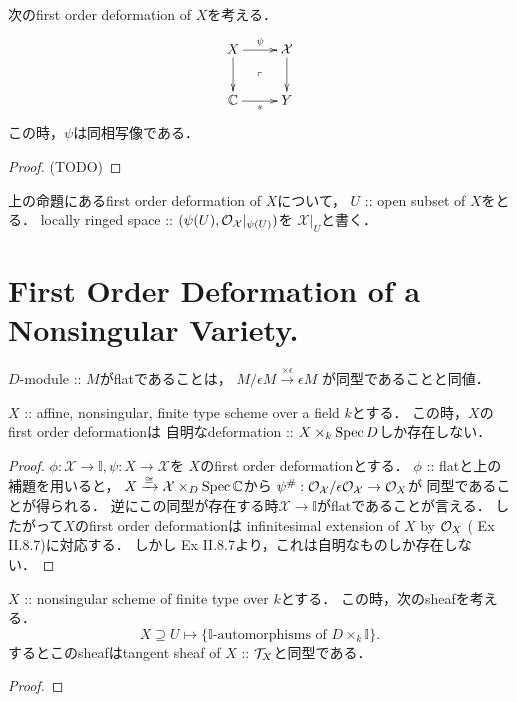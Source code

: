 \documentclass[a4paper]{jsarticle}
\newcommand{\dualnum}{\mathbb{I}}
\newcommand{\famX}{\mathcal{X}}
\begin{document}
    \begin{Lemma}
        次のfirst order deformation of $X$を考える．
        \[\vcenter{\xymatrix{
            X \ar[r]^-{\psi} \ar[d]& \famX \ar[d] \\
            \C \ar[r]_-{s}& Y
            \ar@{}[lu]|{\ulcorner}
        }}\]
        この時，$\psi$は同相写像である．
    \end{Lemma}
    \begin{proof}
        (TODO)
    \end{proof}

    \begin{Def}
        上の命題にあるfirst order deformation of $X$について，
        $U$ :: open subset of $X$をとる．
        locally ringed space :: $(\psi(U), \shO_{\famX}|_{\psi(U)})$を
        $\famX|_U$と書く．
    \end{Def}

\section{First Order Deformation of a Nonsingular Variety.}
    \begin{Lemma}
        $D$-module :: $M$がflatであることは，
        $M/\epsilon M \xrightarrow{\times \epsilon} \epsilon M$
        が同型であることと同値．
    \end{Lemma}

    \begin{Lemma}
        $X$ :: affine, nonsingular, finite type scheme over a field $k$とする．
        この時，$X$のfirst order deformationは
        自明なdeformation :: $X \times_k \operatorname{Spec} D$しか存在しない．
    \end{Lemma}
    \begin{proof}
        $\phi: \famX \to \dualnum, \psi: X \to \famX$を
        $X$のfirst order deformationとする．
        $\phi$ :: flatと上の補題を用いると，
        $X \isomap \famX \times_{D} \Spec \C$から
        $\psi^{\#}: \shO_{\famX}/\epsilon \shO_{\famX} \to \shO_X$が
        同型であることが得られる．
        逆にこの同型が存在する時$\famX \to \dualnum$がflatであることが言える．
        したがって$X$のfirst order deformationは
        infinitesimal extension of $X$ by $\mathcal{O}_X$ (\cite{HarAG} Ex II.8.7)に対応する．
        しかし\cite{HarAG} Ex II.8.7より，これは自明なものしか存在しない．
    \end{proof}

    \begin{Lemma}
        $X$ :: nonsingular scheme of finite type over $k$とする．
        この時，次のsheafを考える．
        \[ X \supseteq U \mapsto \{ \text{$\dualnum$-automorphisms of $D \times_k \dualnum$} \}. \]
        するとこのsheafはtangent sheaf of $X$ :: $\mathcal{T}_X$と同型である．
    \end{Lemma}
    \begin{proof}
    \end{proof}
\end{document}
